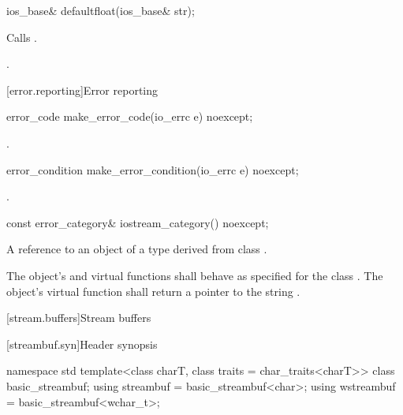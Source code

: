 %
\begin{itemdecl}
ios_base& defaultfloat(ios_base& str);
\end{itemdecl}

\begin{itemdescr}
\pnum
\effects
Calls .

\pnum
\returns
{}.
\end{itemdescr}

[error.reporting]{Error reporting}

%
\begin{itemdecl}
error_code make_error_code(io_errc e) noexcept;
\end{itemdecl}

\begin{itemdescr}
\pnum
\returns
{}.
\end{itemdescr}

%
\begin{itemdecl}
error_condition make_error_condition(io_errc e) noexcept;
\end{itemdecl}

\begin{itemdescr}
\pnum
\returns
{}.
\end{itemdescr}

%
\begin{itemdecl}
const error_category& iostream_category() noexcept;
\end{itemdecl}

\begin{itemdescr}
\pnum
\returns
A reference to an object of a type derived from class
.

\pnum
The object's  and  virtual functions shall behave as specified for the class . The object's  virtual function shall return a pointer to the string .
\end{itemdescr}


[stream.buffers]{Stream buffers}

[streambuf.syn]{Header  synopsis}

%
%
%
%
%
\begin{codeblock}
namespace std {
  template<class charT, class traits = char_traits<charT>>
    class basic_streambuf;
  using streambuf  = basic_streambuf<char>;
  using wstreambuf = basic_streambuf<wchar_t>;
}
\end{codeblock}

